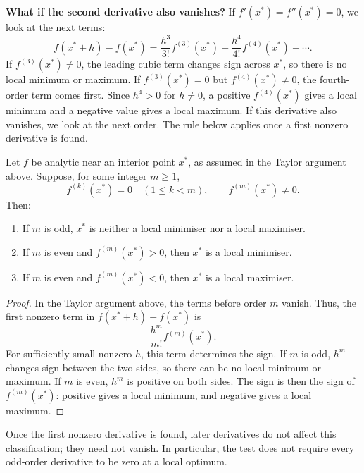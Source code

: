 \textbf{What if the second derivative also vanishes?}
If $f'(x^*)=f''(x^*)=0$, we look at the next terms:
\begin{equation}
	f(x^*+h)-f(x^*)
	=\frac{h^3}{3!}f^{(3)}(x^*)
	+\frac{h^4}{4!}f^{(4)}(x^*)+\cdots.
	\label{eq:lec04-third-fourth-order}
\end{equation}
If $f^{(3)}(x^*)\neq0$, the leading cubic term changes sign across $x^*$, so there is no local minimum or maximum. If $f^{(3)}(x^*)=0$ but $f^{(4)}(x^*)\neq0$, the fourth-order term comes first. Since $h^4>0$ for $h\neq0$, a positive $f^{(4)}(x^*)$ gives a local minimum and a negative value gives a local maximum. If this derivative also vanishes, we look at the next order. The rule below applies once a first nonzero derivative is found.

\begin{theorem}\label{thm:first-nonzero-derivative-test}
	Let $f$ be analytic near an interior point $x^*$, as assumed in the Taylor argument above. Suppose, for some integer $m\geq1$,
	\begin{equation}
		f^{(k)}(x^*)=0\quad(1\leq k<m),
		\qquad f^{(m)}(x^*)\neq0.
		\label{eq:lec04-first-nonzero}
	\end{equation}
	Then:
	\begin{enumerate}
		\item If $m$ is odd, $x^*$ is neither a local minimiser nor a local maximiser.
		\item If $m$ is even and $f^{(m)}(x^*)>0$, then $x^*$ is a local minimiser.
		\item If $m$ is even and $f^{(m)}(x^*)<0$, then $x^*$ is a local maximiser.
	\end{enumerate}
\end{theorem}
\begin{proof}
	In the Taylor argument above, the terms before order $m$ vanish. Thus, the first nonzero term in $f(x^*+h)-f(x^*)$ is
	\[
		\frac{h^m}{m!}f^{(m)}(x^*).
	\]
	For sufficiently small nonzero $h$, this term determines the sign. If $m$ is odd, $h^m$ changes sign between the two sides, so there can be no local minimum or maximum. If $m$ is even, $h^m$ is positive on both sides. The sign is then the sign of $f^{(m)}(x^*)$: positive gives a local minimum, and negative gives a local maximum.
\end{proof}

Once the first nonzero derivative is found, later derivatives do not affect this classification; they need not vanish. In particular, the test does not require every odd-order derivative to be zero at a local optimum.

